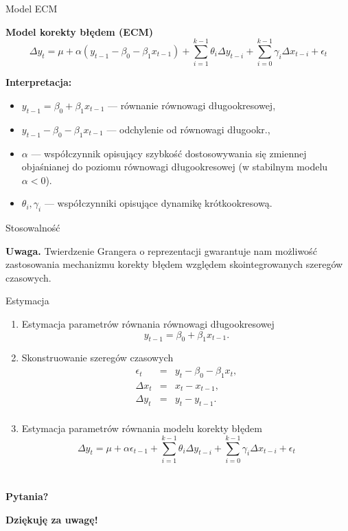 \documentclass[a4paper, 11pt]{beamer}
\begin{document}
	\begin{frame}{Model ECM}
		\begin{block}{\textbf{Model korekty błędem (ECM)}}
			\[
				\Delta y_{t} =
					\mu +
					\alpha \left(y_{t-1} - \beta_{0} - \beta_{1} x_{t-1}\right) + 
					\sum_{i=1}^{k-1} \theta_{i} \Delta y_{t-i} + 
					\sum_{i=0}^{k-1} \gamma_{i} \Delta x_{t-i} + 
					\epsilon_{t}
			\]
		\end{block}
		\textbf{Interpretacja:}
		\begin{itemize}
			\item $y_{t-1} = \beta_{0} + \beta_{1} x_{t-1}$ --- równanie równowagi
				długookresowej,
			\item $y_{t-1} - \beta_{0} - \beta_{1} x_{t-1}$ --- odchylenie od 
				równowagi długookr.,
			\item $\alpha$ --- współczynnik opisujący szybkość dostosowywania się 
				zmiennej objaśnianej do poziomu równowagi długookresowej (w 
				stabilnym modelu $\alpha < 0$).
			\item $\theta_{i}, \gamma_{i}$ --- współczynniki opisujące dynamikę
				krótkookresową.
		\end{itemize}
	\end{frame}
	
	\begin{frame}{Stosowalność}
		\begin{alert}{\textbf{Uwaga.}}
			Twierdzenie Grangera o reprezentacji gwarantuje nam możliwość
			zastosowania mechanizmu korekty błędem względem skointegrowanych
			szeregów czasowych.
		\end{alert}
	\end{frame}
	
	\begin{frame}{Estymacja}
		\begin{enumerate}
			\item Estymacja parametrów równania równowagi długookresowej \[
				y_{t-1} = \beta_{0} + \beta_{1} x_{t-1}.
			\]
			\item Skonstruowanie szeregów czasowych \begin{eqnarray*}
				\epsilon_{t} & = & y_{t} - \beta_{0} - \beta_{1} x_{t},\\
				\Delta x_{t} & = & x_{t} - x_{t-1},\\
				\Delta y_{t} & = & y_{t} - y_{t-1}.\\
			\end{eqnarray*}
			\item Estymacja parametrów równania modelu korekty błędem \[
				\Delta y_{t} =
					\mu +
					\alpha \epsilon_{t-1} + 
					\sum_{i=1}^{k-1} \theta_{i} \Delta y_{t-i} + 
					\sum_{i=0}^{k-1} \gamma_{i} \Delta x_{t-i} + 
					\epsilon_{t}
			\]
		\end{enumerate}
	\end{frame}

	\section*{}

	\begin{frame}
		\center
		\Huge \bfseries
		Pytania?
	\end{frame}

	\begin{frame}
		\center
		\Huge \bfseries
		Dziękuję za uwagę!
	\end{frame}
\end{document}
